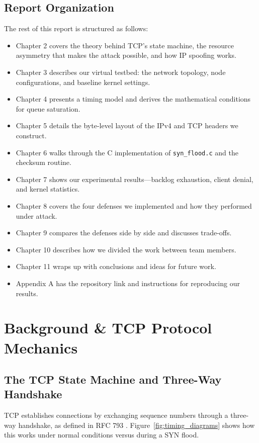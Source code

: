 \documentclass[11pt,a4paper]{report}
\begin{document}
\section{Report Organization}
The rest of this report is structured as follows:
\begin{itemize}
    \item Chapter 2 covers the theory behind TCP's state machine, the resource asymmetry that makes the attack possible, and how IP spoofing works.
    \item Chapter 3 describes our virtual testbed: the network topology, node configurations, and baseline kernel settings.
    \item Chapter 4 presents a timing model and derives the mathematical conditions for queue saturation.
    \item Chapter 5 details the byte-level layout of the IPv4 and TCP headers we construct.
    \item Chapter 6 walks through the C implementation of \texttt{syn\_flood.c} and the checksum routine.
    \item Chapter 7 shows our experimental results---backlog exhaustion, client denial, and kernel statistics.
    \item Chapter 8 covers the four defenses we implemented and how they performed under attack.
    \item Chapter 9 compares the defenses side by side and discusses trade-offs.
    \item Chapter 10 describes how we divided the work between team members.
    \item Chapter 11 wraps up with conclusions and ideas for future work.
    \item Appendix A has the repository link and instructions for reproducing our results.
\end{itemize}

\chapter{Background \& TCP Protocol Mechanics}

\section{The TCP State Machine and Three-Way Handshake}
TCP establishes connections by exchanging sequence numbers through a three-way handshake, as defined in RFC 793 \cite{rfc793}. Figure~\ref{fig:timing_diagrams} shows how this works under normal conditions versus during a SYN flood.
\end{document}
